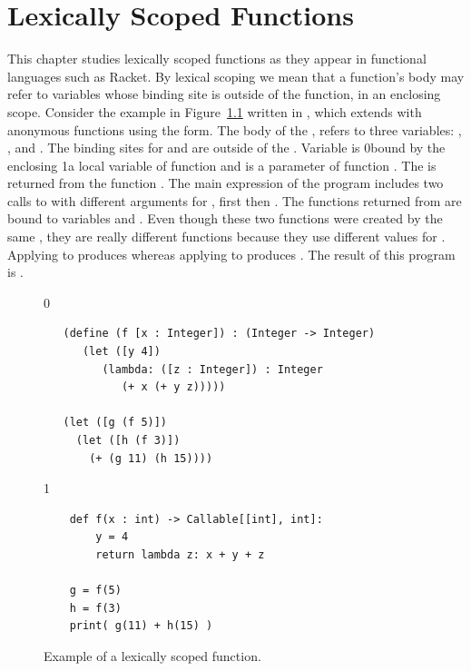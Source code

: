 \documentclass[7x10]{TimesAPriori_MIT}%
\def\racketEd{0}
\def\pythonEd{1}
\def\edition{1}
\newcommand{\racket}[1]{{\if\edition\racketEd{#1}\fi}}
\newcommand{\python}[1]{{\if\edition\pythonEd #1\fi}}
\begin{document}




\chapter{Lexically Scoped Functions}
\label{ch:Rlam}

This chapter studies lexically scoped functions as they appear in
functional languages such as Racket. By lexical scoping we mean that a
function's body may refer to variables whose binding site is outside
of the function, in an enclosing scope.
%
Consider the example in Figure~\ref{fig:lexical-scoping} written in
\LangLam{}, which extends \LangFun{} with anonymous functions using the
 form.  The body of the , refers to three
variables: , , and . The binding sites for
 and  are outside of the . Variable
 is \racket{bound by the enclosing }\python{a local variable of function} and  is a
parameter of function . The  is returned from the
function . The main expression of the program includes two
calls to  with different arguments for , first
 then . The functions returned from  are bound
to variables  and . Even though these two functions
were created by the same , they are really different
functions because they use different values for . Applying
 to  produces  whereas applying  to
 produces . The result of this program is .

\begin{figure}[btp]
{\if\edition\racketEd
\begin{lstlisting}
   (define (f [x : Integer]) : (Integer -> Integer)
      (let ([y 4])
         (lambda: ([z : Integer]) : Integer
            (+ x (+ y z)))))

   (let ([g (f 5)])
     (let ([h (f 3)])
       (+ (g 11) (h 15))))
\end{lstlisting}
\fi}
{\if\edition\pythonEd
\begin{lstlisting}
    def f(x : int) -> Callable[[int], int]:
        y = 4
        return lambda z: x + y + z

    g = f(5)
    h = f(3)
    print( g(11) + h(15) )
\end{lstlisting}
\fi}
\caption{Example of a lexically scoped function.}
\label{fig:lexical-scoping}
\end{figure}
\end{document}
